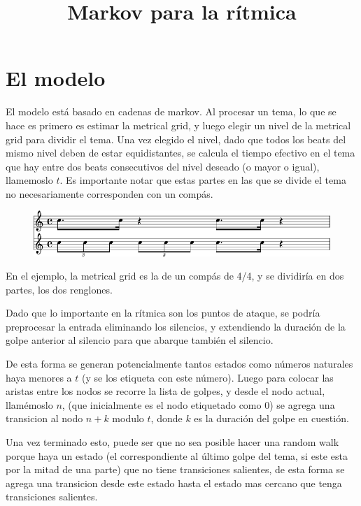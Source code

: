 \documentclass[a4paper,10pt]{article}
\title{Markov para la r\'itmica}
\begin{document}
\maketitle
\section{El modelo}
El modelo est\'a basado en cadenas de markov. Al procesar un tema, lo que se hace es primero es estimar la metrical 
grid, y luego elegir un nivel de la metrical grid para dividir el tema.
Una vez elegido el nivel, dado que todos los beats del mismo nivel deben de estar equidistantes, se calcula el 
tiempo efectivo en el tema que hay entre dos beats consecutivos del nivel deseado (o mayor o igual), llamemoslo $t$.
Es importante notar que estas partes en las que se divide el tema no necesariamente corresponden con un comp\'as.

\begin{figure}[h]
\begin{center}
\includegraphics[width=12cm]{images/reggae.png}
\label{fig:reggae}
\end{center}
\end{figure}

En el ejemplo, la metrical grid es la de un comp\'as de 4/4, y se dividir\'ia en dos partes, los dos renglones.

Dado que lo importante en la r\'itmica son los puntos de ataque, se podr\'ia preprocesar la entrada eliminando los silencios, y  
extendiendo la duraci\'on de la golpe anterior al silencio para que abarque tambi\'en el silencio.

De esta forma se generan potencialmente tantos estados como n\'umeros naturales haya menores a $t$ (y se los etiqueta con este n\'umero).
Luego para colocar las aristas entre los nodos se recorre la lista de golpes, y desde el nodo actual, llam\'emoslo
$n$, (que inicialmente es el nodo etiquetado como 0) se agrega una transicion al nodo $n+k$ modulo $t$,
donde $k$ es la duraci\'on del golpe en cuesti\'on.

Una vez terminado esto, puede ser que no sea posible hacer una random walk porque haya un estado (el correspondiente al \'ultimo golpe del tema, si 
este esta por la mitad de una parte) 
que no tiene transiciones salientes, de esta forma se agrega una transicion desde este estado hasta el estado mas cercano
que tenga transiciones salientes.
\end{document}

